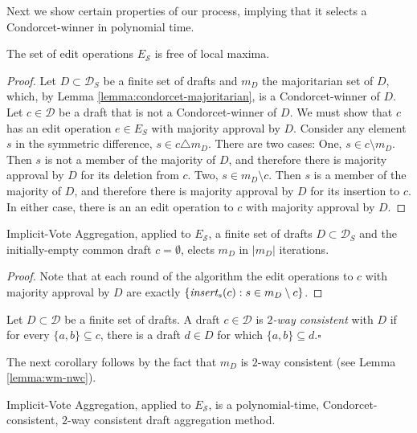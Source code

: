 \documentclass{llncs}
\newcommand{\qqed}{\hfill$\square$}
\newcommand{\calD}{\mathcal{D}}
\newcommand{\calS}{\mathcal{S}}
\newcommand{\iinsert}[1]{\emph{insert}_{#1}}
\begin{document}
Next we show certain properties of our process, implying that it selects a Condorcet-winner in polynomial time.

\begin{lemma}
  The set of edit operations $E_\calS$ is free of local maxima.
\end{lemma}

\begin{proof}
%
Let $D \subset \calD_S$ be a finite set of drafts and $m_D$ the majoritarian set of $D$, which, by Lemma \ref{lemma:condorcet-majoritarian}, is a Condorcet-winner of $D$.  Let $c \in \calD$ be a draft that is not a Condorcet-winner of $D$. We must show that
$c$ has an edit operation $e \in E_S$ with majority approval by $D$. Consider any  element $s$ in the symmetric difference,  $s \in c \triangle m_D$.
There are two cases: One, $s \in c \setminus m_D$. Then $s$ is not a member of the majority of $D$, and therefore there is majority approval by $D$ for its deletion from $c$.
Two, $s \in m_D \setminus c$. Then $s$ is a member of the majority of $D$, and therefore there is majority approval by $D$ for its insertion to  $c$. In either case, there is an an edit operation to $c$ with majority approval by $D$.
%
\end{proof}

\begin{lemma}
Implicit-Vote Aggregation, applied to $E_\calS$,  a finite set of drafts $D \subset \calD_S$ and the initially-empty common draft $c = \emptyset$, elects $m_D$ in $|m_D|$ iterations.
\end{lemma}

\begin{proof}
Note that at each round of the algorithm the edit operations to $c$ with majority approval by $D$ are exactly $\{\iinsert{s}(c) : s \in m_D \setminus c\}$.
\end{proof}

\begin{definition}
Let $D \subset \calD$ be a finite set of drafts. A draft $c \in \calD$ is \emph{$2$-way consistent} with $D$ if for every $\{a,b\} \subseteq c$, there is a draft $d \in D$ for which $\{a,b\} \subseteq d$.\qqed
\end{definition}

The next corollary follows by the fact that $m_D$ is $2$-way consistent (see Lemma \ref{lemma:wm-nwc}).

\begin{corollary}
Implicit-Vote Aggregation, applied to $E_\calS$, is a polynomial-time, Condorcet-consistent, $2$-way consistent draft aggregation method.
\end{corollary}
\end{document}
